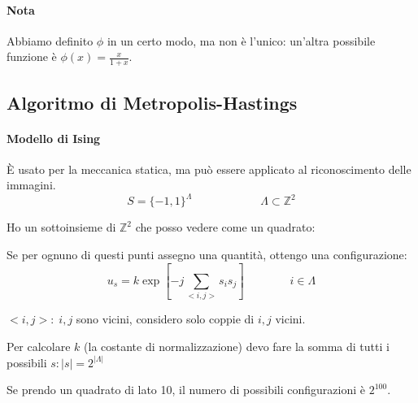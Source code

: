 \documentclass[a4paper,12pt]{book}
\newcommand\ddfrac[2]{\frac{\displaystyle #1}{\displaystyle #2}}
\begin{document}
\paragraph{Nota} Abbiamo definito $\phi$ in un certo modo, ma non è l'unico: un'altra possibile funzione è $ \phi(x) = \ddfrac{x}{1+x} $.

\subsection{Algoritmo di Metropolis-Hastings}
\paragraph{Modello di Ising}
È usato per la meccanica statica, ma può essere applicato al riconoscimento delle immagini. 
$$ S = \{-1, 1\}^\Lambda \qquad \qquad \qquad \Lambda \subset \mathbb{Z}^2 $$

Ho un sottoinsieme di $ \mathbb{Z}^2 $ che posso vedere come un quadrato:

\begin{multicols}{2}
	
	Se per ognuno di questi punti assegno una quantità, ottengo una configurazione:
	$$ u_s = k \exp \left[-j \sum_{<i,j>}s_i s_j\right] \qquad \qquad i \in \Lambda $$
\end{multicols}

$ <i,j>: \; i,j $ sono vicini, considero solo coppie di $ i,j $ vicini. 

Per calcolare $ k $ (la costante di normalizzazione) devo fare la somma di tutti i possibili $ s: |s| = 2^{|\Lambda|} $ %

Se prendo un quadrato di lato 10, il numero di possibili configurazioni è $ 2^{100} $.
\end{document}
